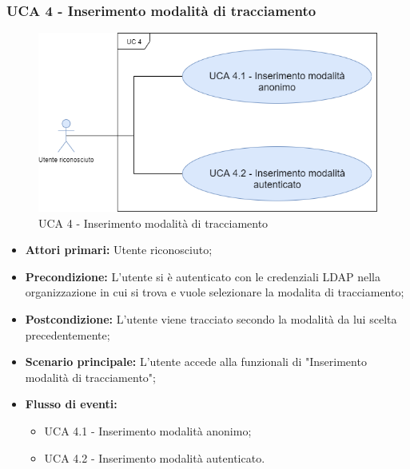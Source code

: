 \newpage

\subsubsection{UCA 4 - Inserimento modalità di tracciamento}%

\begin{figure}[h]
	\centering	
	\includegraphics[scale=0.53]{sezioni/UseCase/Immagini/UCA4.png}
	\caption{UCA 4 - Inserimento modalità di tracciamento}
\end{figure}

\begin{itemize}
	\item \textbf{Attori primari:} Utente riconosciuto;
	\item \textbf{Precondizione:} L'utente si è autenticato con le credenziali LDAP nella organizzazione in cui si trova e vuole selezionare la modalita di tracciamento;
	\item \textbf{Postcondizione:} L'utente viene tracciato secondo la modalità da lui scelta precedentemente; 
	\item \textbf{Scenario principale:} L'utente accede alla funzionali di "Inserimento modalità di tracciamento";
	\item \textbf{Flusso di eventi:}
	\begin{itemize}
		\item UCA 4.1 - Inserimento modalità anonimo;
		\item UCA 4.2 - Inserimento modalità autenticato.
	\end{itemize}
\end{itemize}

